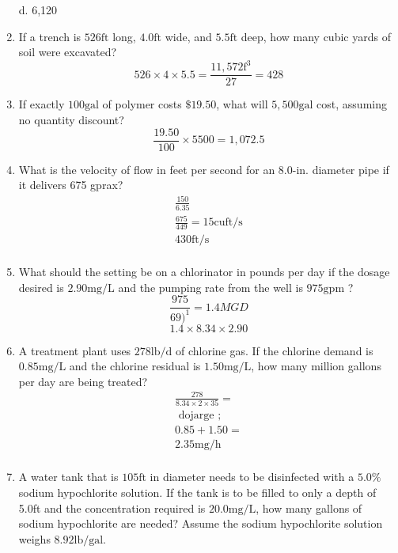 \begin{enumerate}
d. 6,120\\
\item If a trench is $526 \mathrm{ft}$ long, $4.0 \mathrm{ft}$ wide, and $5.5 \mathrm{ft}$ deep, how many cubic yards of soil were excavated?\\
$$
526 \times 4 \times 5.5=\frac{11,572 \mathrm{f}^{3}}{27}=428
$$
\item If exactly $100 \mathrm{gal}$ of polymer costs $\$ 19.50$, what will $5,500 \mathrm{gal}$ cost, assuming no quantity discount?\\
$$
\frac{19.50}{100} \times 5500=1,072.5
$$
\item What is the velocity of flow in feet per second for an 8.0-in. diameter pipe if it delivers 675 gprax?\\
$$
\begin{gathered}
\frac{150}{6.35} \\
\frac{675}{449}=15 \mathrm{cuft} / \mathrm{s} \\
430 \mathrm{ft} / \mathrm{s}\\
\end{gathered}
$$
\item What should the setting be on a chlorinator in pounds per day if the dosage desired is $2.90 \mathrm{mg} / \mathrm{L}$ and the pumping rate from the well is $975 \mathrm{gpm}$ ?\\
$$
\frac{975}{69)^{1}}=1.4 M G D
$$
$$
1.4 \times 8.34 \times 2.90
$$
\item A treatment plant uses $278 \mathrm{lb} / \mathrm{d}$ of chlorine gas. If the chlorine demand is $0.85 \mathrm{mg} / \mathrm{L}$ and the chlorine residual is $1.50 \mathrm{mg} / \mathrm{L}$, how many million gallons per day are being treated?
$$
\begin{gathered}
\frac{278}{8.34 \times 2 \times 35}= \\
\text { dojarge } ; \\
0.85+1.50= \\
2.35 \mathrm{mg} / \mathrm{h}\\
\end{gathered}
$$
\item A water tank that is $105 \mathrm{ft}$ in diameter needs to be disinfected with a $5.0 \%$ sodium hypochlorite solution. If the tank is to be filled to only a depth of 5.0ft and the concentration required is $20.0 \mathrm{mg} / \mathrm{L}$, how many gallons of sodium hypochlorite are needed? Assume the sodium hypochlorite solution weighs $8.92 \mathrm{lb} / \mathrm{gal}$.\\

\end{enumerate}
